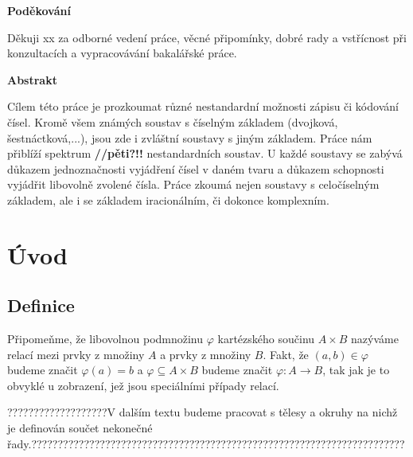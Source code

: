 \documentclass[12pt]{book}
\begin{document}
\newpage

\begin{center}
	\textbf{Poděkování}

Děkuji xx za odborné vedení práce, věcné připomínky, dobré rady a vstřícnost při
konzultacích a vypracovávání bakalářské práce.
\end{center}

\newpage

\textbf{Abstrakt}

Cílem této práce je prozkoumat různé nestandardní možnosti zápisu či kódování čísel. Kromě všem známých soustav s číselným základem (dvojková, šestnáctková,...), jsou zde i zvláštní soustavy s jiným základem. Práce nám přiblíží spektrum \textbf{//pěti?!!} nestandardních soustav. U každé soustavy se zabývá důkazem jednoznačnosti vyjádření čísel v daném tvaru a důkazem schopnosti vyjádřit libovolně zvolené čísla. Práce zkoumá nejen soustavy s celočíselným základem, ale i se základem iracionálním, či dokonce komplexním.

\newpage

\tableofcontents

\newpage

\section{Úvod}
\subsection{Definice}

\newcommand{\poslbeta}{\{\beta_i\}_{i=1}^{\infty}}
\newcommand{\poslalpha}{\{\alpha_i\}_{i=0}^{\infty}}
\newcommand{\posla}{\{a_i\}_{i=0}^{\infty}}
\newcommand{\poslb}{\{b_i\}_{i=1}^{\infty}}

Připomeňme, že libovolnou podmnožinu $\varphi$ kartézského součinu $A \times B$ nazýváme relací mezi prvky z množiny $A$ a prvky z množiny $B$. Fakt, že $(a,b)\in \varphi$ budeme značit $\varphi(a) = b$ a $\varphi \subseteq A \times B$ budeme značit $\varphi : A \rightarrow B$, tak jak je to obvyklé u zobrazení, jež jsou speciálními případy relací.

???????????????????V dalším textu budeme pracovat s tělesy a okruhy na nichž je definován součet nekonečné řady.???????????????????????????????????????????????????????????????????????
\end{document}
